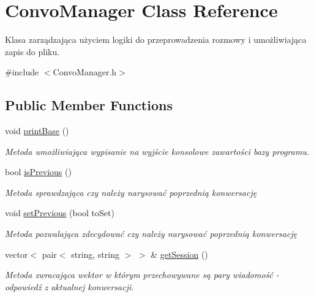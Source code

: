 \hypertarget{class_convo_manager}{}\section{Convo\+Manager Class Reference}
\label{class_convo_manager}


Klasa zarządzająca użyciem logiki do przeprowadzenia rozmowy i umożliwiająca zapis do pliku.  




{\ttfamily \#include $<$Convo\+Manager.\+h$>$}

\subsection*{Public Member Functions}
\begin{DoxyCompactItemize}
\item 
\mbox{\label{class_convo_manager_af13019a25a85c58bd8a931235598a246}} 
void \mbox{\hyperlink{class_convo_manager_af13019a25a85c58bd8a931235598a246}{print\+Base}} ()
\begin{DoxyCompactList}\small\item\em Metoda umożliwiająca wypisanie na wyjście konsolowe zawartości bazy programu. \end{DoxyCompactList}\item 
bool \mbox{\hyperlink{class_convo_manager_aae9ce968bce8d48be1f852eb67339306}{is\+Previous}} ()
\begin{DoxyCompactList}\small\item\em Metoda sprawdzająca czy należy narysować poprzednią konwersację \end{DoxyCompactList}\item 
void \mbox{\hyperlink{class_convo_manager_a1fe9e8f09c59c7043ac51185c6728fb7}{set\+Previous}} (bool to\+Set)
\begin{DoxyCompactList}\small\item\em Metoda pozwalająca zdecydować czy należy narysować poprzednią konwersację \end{DoxyCompactList}\item 
vector$<$ pair$<$ string, string $>$ $>$ \& \mbox{\hyperlink{class_convo_manager_a6297e90e7ecf3dc307005b6f14c7bd82}{get\+Session}} ()
\begin{DoxyCompactList}\small\item\em Metoda zwracająca wektor w którym przechowywane są pary wiadomość -\/ odpowiedź z aktualnej konwersacji. \end{DoxyCompactList}\item 

\end{DoxyCompactItemize}
